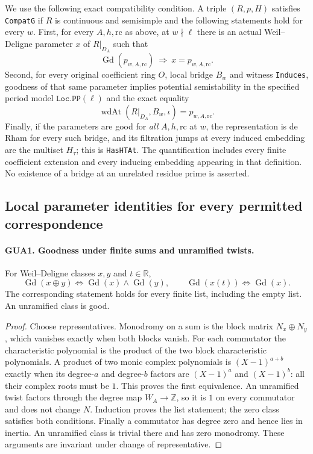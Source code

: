 We use the following exact compatibility condition.  A triple
$(R,p,H)$ satisfies \texttt{CompatG} if $R$ is continuous and
semisimple and the following statements hold for every $w$.
First, for every $A,h,\mathrm{rc}$ as above, at $w\nmid\ell$
there is an actual Weil--Deligne parameter $x$ of $R|_{D_A}$
such that
\[
             \operatorname{Gd}(p_{w,A,\mathrm{rc}})
                    \ \Longrightarrow\ x=p_{w,A,\mathrm{rc}}.
                                                        \tag{GUA.3}
\]
Second, for every original coefficient ring $O$, local bridge
$B_w$ and witness \texttt{Induces}, goodness of that same
parameter implies potential semistability in the specified
period model $\texttt{Loc.PP}(\ell)$ and the exact equality
\[
 \operatorname{wdAt}(R|_{D_A},B_w,\iota)
                              =p_{w,A,\mathrm{rc}}.       \tag{GUA.4}
\]
Finally, if the parameters are good for \emph{all}
$A,h,\mathrm{rc}$ at $w$, the representation is de Rham for
every such bridge, and its filtration jumps at every induced
embedding are the multiset $H_\tau$; this is
\texttt{HasHTAt}.  The quantification includes every finite
coefficient extension and every inducing embedding appearing
in that definition.  No existence of a bridge at an unrelated
residue prime is asserted.

\subsection{Local parameter identities for every permitted correspondence}

\paragraph{GUA1. Goodness under finite sums and unramified twists.}
\label{claim:GUA1}
For Weil--Deligne classes $x,y$ and $t\in\mathbb R$,
\[
 \operatorname{Gd}(x\oplus y)
       \Longleftrightarrow\operatorname{Gd}(x)\wedge\operatorname{Gd}(y),
 \qquad
 \operatorname{Gd}(x(t))\Longleftrightarrow\operatorname{Gd}(x).
\]
The corresponding statement holds for every finite list,
including the empty list.  An unramified class is good.
\begin{proof}
Choose representatives.  Monodromy on a sum is the block
matrix $N_x\oplus N_y$, which vanishes exactly when both
blocks vanish.  For each commutator the characteristic
polynomial is the product of the two block characteristic
polynomials.  A product of two monic complex polynomials is
$(X-1)^{a+b}$ exactly when its degree-$a$ and degree-$b$
factors are $(X-1)^a$ and $(X-1)^b$: all their complex roots
must be $1$.  This proves the first equivalence.  An
unramified twist factors through the degree map
$W_A\to\mathbb Z$, so it is $1$ on every commutator and
does not change $N$.  Induction proves the list statement;
the zero class satisfies both conditions.  Finally a
commutator has degree zero and hence lies in inertia.  An
unramified class is trivial there and has zero monodromy.
These arguments are invariant under change of representative.
\end{proof}

